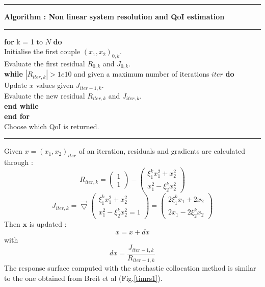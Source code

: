 \documentclass[11pt, a4paper, English]{report}
\begin{document}
\hrule 
\vspace{0.25cm}
\textbf{Algorithm : Non linear system resolution and QoI estimation}
\vspace{0.25cm}
\hrule
\vspace{0.25cm}
\textbf{for} k = 1 to $N$ \textbf{do} \\
Initialise the first couple $(x_1, x_2)_{0,k}$. \\
Evaluate the first residual $R_{0,k}$ and $J_{0,k}$. \\
\textbf{while} $|R_{iter,k}|>1e10$ and given a maximum number of iterations $iter$ \textbf{do} \\
Update $x$ values given $J_{iter-1, k}$.\\
Evaluate the new residual $R_{iter,k} $ and $J_{iter,k}$. \\
\textbf{end while}\\
\textbf{end for} \\
Choose which QoI is returned. \\
\hrule
\vspace{0.25cm}
Given $x = (x_1, x_2)_{iter}$ of an iteration, residuals and gradients are calculated through :
$$R_{iter, k} =
\begin{pmatrix}
1 \\
1
\end{pmatrix}
-
\begin{pmatrix}
\xi_1^k x_1^2 + x_2^2 \\
x_1^2 - \xi_2^k x_2^2
\end{pmatrix}
$$
$$J_{iter, k} = \Vec{\bigtriangledown} \begin{pmatrix}
\xi_1^k x_1^2 + x_2^2 \\
 x_1^2 - \xi_2^k x_2^2 = 1
\end{pmatrix} 
=
\begin{pmatrix}
2\xi_1^k x_1 + 2x_2 \\
2x_1 - 2\xi_2^k x_2
\end{pmatrix}
$$
Then $\boldsymbol{x}$ is updated :
$$ x = x + dx $$
with
$$ dx =\frac{J_{iter-1,k}}{R_{iter-1,k}} $$
The response surface computed with the stochastic collocation method is similar to the one obtained from Breit et al \cite{Tim1} (Fig.\ref{timrs1}). 
\end{document}
